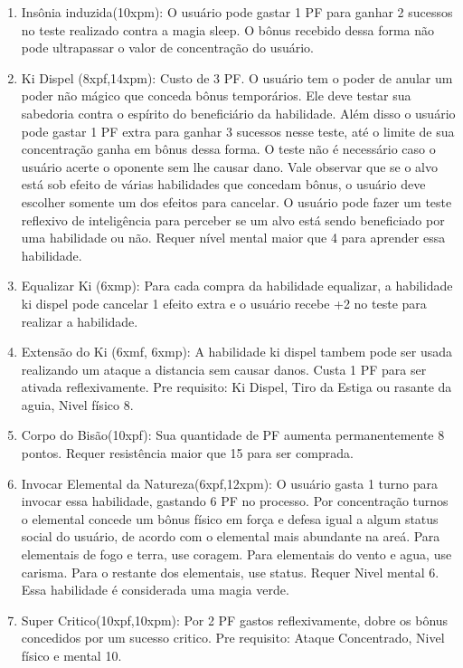 \begin{enumerate}
	\item Insônia induzida(10xpm): O usuário pode gastar 1 PF para ganhar 2 sucessos no teste realizado contra a magia sleep. O bônus recebido dessa forma não pode ultrapassar o valor de concentração do usuário.
	
	  \item Ki Dispel (8xpf,14xpm): Custo de 3 PF.
O usuário tem o poder de anular um poder não mágico que conceda bônus temporários. Ele deve testar sua sabedoria contra o espírito do beneficiário da habilidade. Além disso o usuário pode gastar 1 PF extra para ganhar 3 sucessos nesse teste, até o limite de sua concentração ganha em bônus dessa forma. O teste não é necessário caso o usuário acerte o oponente sem lhe causar dano. Vale observar que se o alvo está sob efeito de várias habilidades que concedam bônus, o usuário deve escolher somente um dos efeitos para cancelar. O usuário pode fazer um teste reflexivo de inteligência para perceber se um alvo está sendo beneficiado por uma habilidade ou não. Requer nível mental maior que 4 para aprender essa habilidade.

	\item Equalizar Ki (6xmp): Para cada compra da habilidade equalizar, a habilidade ki dispel pode cancelar 1 efeito extra e o usuário recebe +2 no teste para realizar a habilidade.
	
	\item Extensão do Ki (6xmf, 6xmp): A habilidade ki dispel tambem pode ser usada realizando um ataque a distancia sem causar danos. Custa 1 PF para ser ativada reflexivamente. Pre requisito: Ki Dispel, Tiro da Estiga ou rasante da aguia, Nivel físico 8.
	
	\item Corpo do Bisão(10xpf): Sua quantidade de PF aumenta permanentemente 8 pontos. Requer resistência maior que 15 para ser comprada.

  	\item Invocar Elemental da Natureza(6xpf,12xpm): O usuário gasta 1 turno para invocar essa habilidade, gastando 6 PF no processo. Por concentração turnos o elemental concede um bônus físico em força e defesa igual a algum status social do usuário, de acordo com o elemental mais abundante na areá. Para elementais de fogo e terra, use coragem. Para elementais do vento e agua, use carisma. Para o restante dos elementais, use status. Requer Nivel mental 6. Essa habilidade é considerada uma magia verde.

  	\item Super Critico(10xpf,10xpm): Por 2 PF gastos reflexivamente, dobre os bônus concedidos por um sucesso critico. Pre requisito: Ataque Concentrado, Nivel físico e mental 10.


\end{enumerate}
